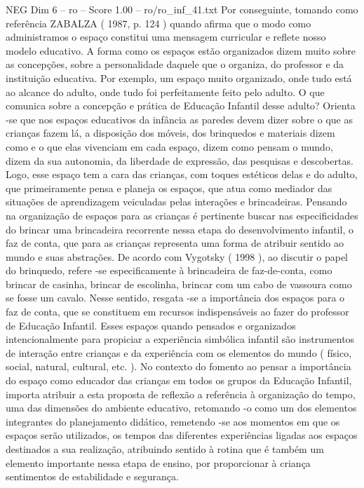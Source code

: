 \begin{textsample}{NEG Dim 6 – ro – Score 1.00 – ro/ro\_inf\_41.txt}
Por conseguinte, tomando como referência ZABALZA ( 1987, p. 124 ) quando afirma que o modo como administramos o espaço constitui uma mensagem curricular e reflete nosso modelo educativo.
A forma como os espaços estão organizados dizem muito sobre as concepções, sobre a personalidade daquele que o organiza, do professor e da instituição educativa.
Por exemplo, um espaço muito organizado, onde tudo está ao alcance do adulto, onde tudo foi perfeitamente feito pelo adulto.
O que comunica sobre a concepção e prática de Educação Infantil desse adulto?
Orienta -se que nos espaços educativos da infância as paredes devem dizer sobre o que as crianças fazem lá, a disposição dos móveis, dos brinquedos e materiais dizem como e o que elas vivenciam em cada espaço, dizem como pensam o mundo, dizem da sua autonomia, da liberdade de expressão, das pesquisas e descobertas.
Logo, esse espaço tem a cara das crianças, com toques estéticos delas e do adulto, que primeiramente pensa e planeja os espaços, que atua como mediador das situações de aprendizagem veiculadas pelas interações e brincadeiras.
Pensando na organização de espaços para as crianças é pertinente buscar nas especificidades do brincar uma brincadeira recorrente nessa etapa do desenvolvimento infantil, o faz de conta, que para as crianças representa uma forma de atribuir sentido ao mundo e suas abstrações.
De acordo com Vygotsky ( 1998 ), ao discutir o papel do brinquedo, refere -se especificamente à brincadeira de faz-de-conta, como brincar de casinha, brincar de escolinha, brincar com um cabo de vassoura como se fosse um cavalo.
Nesse sentido, resgata -se a importância dos espaços para o faz de conta, que se constituem em recursos indispensáveis ao fazer do professor de Educação Infantil.
Esses espaços quando pensados e organizados intencionalmente para propiciar a experiência simbólica infantil são instrumentos de interação entre crianças e da experiência com os elementos do mundo ( físico, social, natural, cultural, etc. ).
No contexto do fomento ao pensar a importância do espaço como educador das crianças em todos os grupos da Educação Infantil, importa atribuir a esta proposta de reflexão a referência à organização do tempo, uma das dimensões do ambiente educativo, retomando -o como um dos elementos integrantes do planejamento didático, remetendo -se aos momentos em que os espaços serão utilizados, os tempos das diferentes experiências ligadas aos espaços destinados a sua realização, atribuindo sentido à rotina que é também um elemento importante nessa etapa de ensino, por proporcionar à criança sentimentos de estabilidade e segurança.

\end{textsample}
